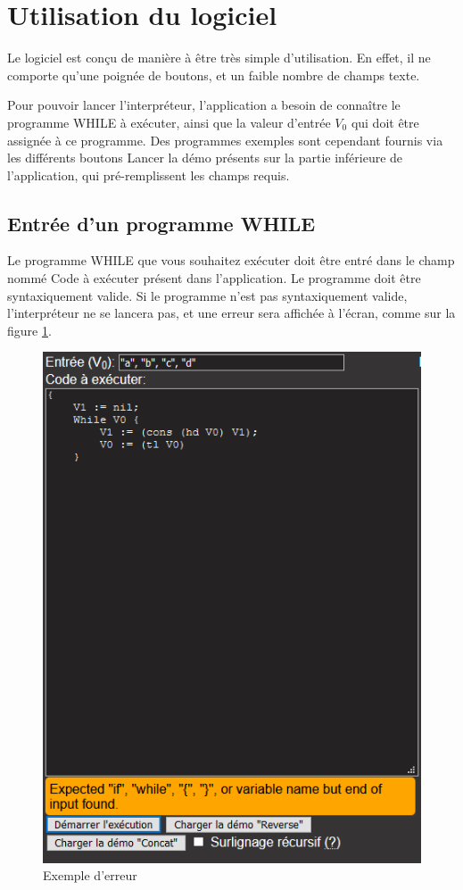 \documentclass{article}
\begin{document}
\section{Utilisation du logiciel}

Le logiciel est conçu de manière à être très simple d'utilisation. En effet, il ne comporte qu'une poignée de boutons, et un faible nombre de champs texte.

Pour pouvoir lancer l'interpréteur, l'application a besoin de connaître le programme WHILE à exécuter, ainsi que la valeur d'entrée $V_0$ qui doit être assignée à ce programme. Des programmes exemples sont cependant fournis via les différents boutons \og Lancer la démo \fg{} présents sur la partie inférieure de l'application, qui pré-remplissent les champs requis.

\subsection{Entrée d'un programme WHILE}

Le programme WHILE que vous souhaitez exécuter doit être entré dans le champ nommé \og Code à exécuter \fg{} présent dans l'application. Le programme doit être syntaxiquement valide. Si le programme n'est pas syntaxiquement valide, l'interpréteur ne se lancera pas, et une erreur sera affichée à l'écran, comme sur la figure \ref{fig:cap2}.

\begin{figure}[h]
\includegraphics[width=\textwidth]{img/Capture2.PNG}
\caption{Exemple d'erreur}
\label{fig:cap2}
\end{figure}
\end{document}
